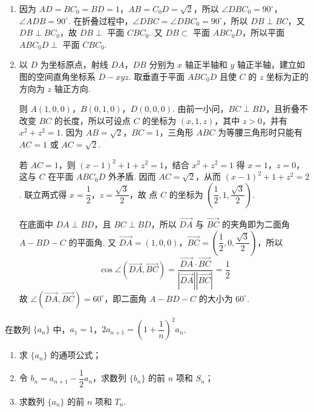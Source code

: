\begin{solution}
\begin{enumerate}
\item 因为 \(AD=BC_0=BD=1\)，\(AB=C_0D=\sqrt2\)，所以 \(\angle DBC_0=90^\circ\)，\(\angle ADB=90^\circ\).
在折叠过程中，\(\angle DBC=\angle DBC_0=90^\circ\)，所以 \(DB\perp BC\)，又 \(DB\perp BC_0\)，故 \(DB\perp\) 平面 \(CBC_0\).
又 \(DB\subset\) 平面 \(ABC_0D\)，所以平面 \(ABC_0D\perp\) 平面 \(CBC_0\).

\item 以 \(D\) 为坐标原点，射线 \(DA\)，\(DB\) 分别为 \(x\) 轴正半轴和 \(y\) 轴正半轴，建立如图的空间直角坐标系 \(D-xyz\). 取垂直于平面 \(ABC_0D\) 且使 \(C\) 的 \(z\) 坐标为正的方向为 \(z\) 轴正方向.


则 \(A(1,0,0)\)，\(B(0,1,0)\)，\(D(0,0,0)\).
由前一小问，\(BC\perp BD\)，且折叠不改变 \(BC\) 的长度，所以可设点 \(C\) 的坐标为 \((x,1,z)\)，其中 \(z>0\)，并有 \(x^2+z^2=1\). 因为 \(AB=\sqrt2\)，\(BC=1\)，三角形 \(ABC\) 为等腰三角形时只能有 \(AC=1\) 或 \(AC=\sqrt2\).

若 \(AC=1\)，则 \((x-1)^2+1+z^2=1\)，结合 \(x^2+z^2=1\) 得 \(x=1\)，\(z=0\)，这与 \(C\) 在平面 \(ABC_0D\) 外矛盾. 因而 \(AC=\sqrt2\)，从而 \((x-1)^2+1+z^2=2\). 联立两式得 \(x=\dfrac12\)，\(z=\dfrac{\sqrt3}{2}\)，故
点 \(C\) 的坐标为 \(\left(\dfrac12,1,\dfrac{\sqrt3}{2}\right)\).

在底面中 \(DA\perp BD\)，且 \(BC\perp BD\)，所以 \(\overrightarrow{DA}\) 与 \(\overrightarrow{BC}\) 的夹角即为二面角 \(A-BD-C\) 的平面角.
又 \(\overrightarrow{DA}=(1,0,0)\)，\(\overrightarrow{BC}=\left(\dfrac12,0,\dfrac{\sqrt3}{2}\right)\)，所以
\[\cos\angle(\overrightarrow{DA},\overrightarrow{BC})=\dfrac{\overrightarrow{DA}\cdot\overrightarrow{BC}}{\left|\overrightarrow{DA}\right|\left|\overrightarrow{BC}\right|}=\dfrac12\]
故 \(\angle(\overrightarrow{DA},\overrightarrow{BC})=60^\circ\)，即二面角 \(A-BD-C\) 的大小为 \(60^\circ\).
\end{enumerate}
\end{solution}

\begin{problem}
在数列 \(\{a_n\}\) 中，\(a_1=1\)，\(2a_{n+1}=\left(1+\dfrac1n\right)^2a_n\).

\begin{enumerate}
\item 求 \(\{a_n\}\) 的通项公式；
\item 令 \(b_n=a_{n+1}-\dfrac12a_n\)，求数列 \(\{b_n\}\) 的前 \(n\) 项和 \(S_n\)；
\item 求数列 \(\{a_n\}\) 的前 \(n\) 项和 \(T_n\).
\end{enumerate}
\end{problem}

